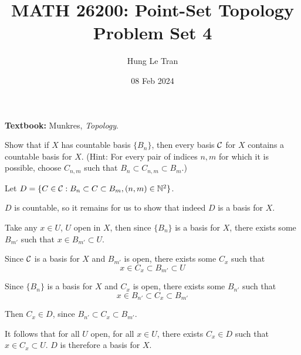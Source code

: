 \documentclass[a4paper, 10pt]{article}
\title{MATH 26200: Point-Set Topology \\ \large Problem Set 4}
\date{08 Feb 2024}
\author{Hung Le Tran}
\begin{document}
\maketitle
\setcounter{section}{5}
\textbf{Textbook:} Munkres, \textit{Topology}.
\begin{problem} 
    Show that if $X$ has countable basis $\{B_n\}$, then every basis $\mathcal{C}$ for $X$ contains a countable basis for $X$. (Hint: For every pair of indices $n, m$ for which it is possible, choose $C_{n, m}$ such that $B_n \subset C_{n,m} \subset B_m$.)
\end{problem}
\begin{solution}
    Let $D = \{C \in \mathcal{C} : B_n \subset C \subset B_m, (n, m) \in \mathbb{N}^2\}$.

    $D$ is countable, so it remains for us to show that indeed $D$ is a basis for $X$.

    Take any $x \in U$, $U$ open in $X$, then since $\{B_n\}$ is a basis for $X$, there exists some $B_{m'}$ such that $x \in B_{m'} \subset U$.

    Since $\mathcal{C}$ is a basis for $X$ and $B_{m'}$ is open, there exists some $C_x$ such that \begin{equation*}
    x \in C_x \subset B_{m'} \subset U
    \end{equation*}

    Since $\{B_n\}$ is a basis for $X$ and $C_x$ is open, there exists some $B_{n'}$ such that \begin{equation*}
    x \in B_{n'}\subset C_x \subset B_{m'}
    \end{equation*}
    
    Then $C_x \in D$, since $B_{n'} \subset C_x \subset B_{m'}$.

    It follows that for all $U$ open, for all $x \in U$, there exists $C_x \in D$ such that $x \in C_x \subset U$. $D$ is therefore a basis for $X$.
\end{solution}
\end{document}
